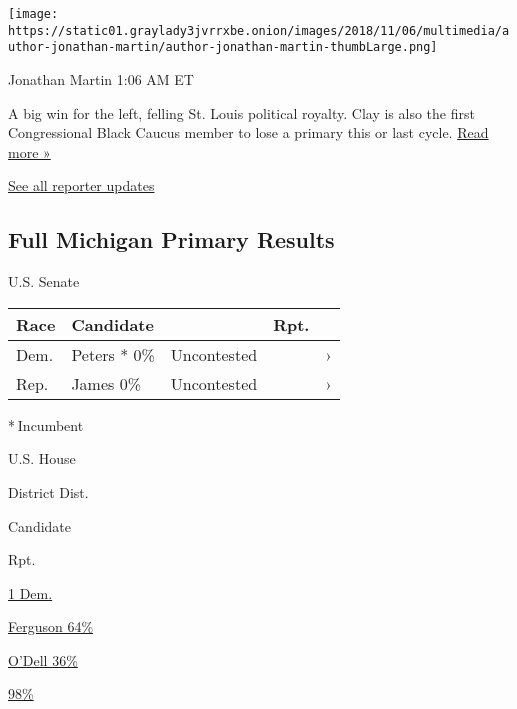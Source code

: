 \texttt{[image: https://static01.graylady3jvrrxbe.onion/images/2018/11/06/multimedia/author-jonathan-martin/author-jonathan-martin-thumbLarge.png]}

Jonathan Martin 1:06 AM ET

A big win for the left, felling St. Louis political royalty. Clay is
also the first Congressional Black Caucus member to lose a primary this
or last cycle.
\href{https://www.nytimes3xbfgragh.onion/2020/08/05/us/politics/cori-bush-missouri-william-lacy-clay.html?action=click\&module=ELEX_results\&pgtype=Interactive\&region=ReporterUpdates}{Read
more »}

\href{https://www.nytimes3xbfgragh.onion/interactive/2020/08/04/us/elections/live-analysis-arizona-kansas-michigan-missouri-primaries.html?action=click\&module=ELEX_results\&pgtype=Interactive\&region=Component}{See
all reporter updates}

\hypertarget{full-michigan-primary-results}{%
\subsection{Full Michigan Primary
Results}\label{full-michigan-primary-results}}

U.S. Senate

\begin{longtable}[]{@{}lllll@{}}
\toprule
Race & Candidate & & Rpt. &\tabularnewline
\midrule
\endhead
Dem. & Peters * 0\% & Uncontested & & ›\tabularnewline
Rep. & James 0\% & Uncontested & & ›\tabularnewline
\bottomrule
\end{longtable}

* Incumbent~

U.S. House

District Dist.

Candidate

Rpt.

\href{https://www.nytimes3xbfgragh.onion/interactive/2020/08/04/us/elections/results-michigan-house-district-1-primary-election.html}{1
Dem.}

\href{https://www.nytimes3xbfgragh.onion/interactive/2020/08/04/us/elections/results-michigan-house-district-1-primary-election.html}{
Ferguson 64\% }

\href{https://www.nytimes3xbfgragh.onion/interactive/2020/08/04/us/elections/results-michigan-house-district-1-primary-election.html}{
O'Dell 36\% }

\href{https://www.nytimes3xbfgragh.onion/interactive/2020/08/04/us/elections/results-michigan-house-district-1-primary-election.html}{98\%}

